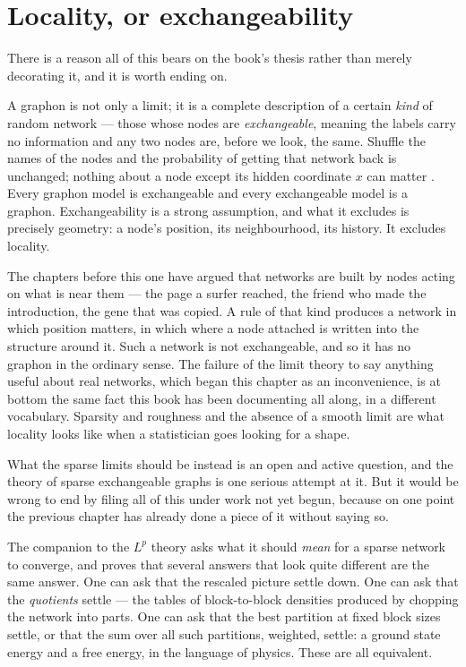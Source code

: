 \section{Locality, or exchangeability}

There is a reason all of this bears on the book's thesis rather than merely
decorating it, and it is worth ending on.

A graphon is not only a limit; it is a complete description of a certain
\emph{kind} of random network --- those whose nodes are \emph{exchangeable},
meaning the labels carry no information and any two nodes are, before we look,
the same. Shuffle the names of the nodes and the probability of getting that
network back is unchanged; nothing about a node except its hidden coordinate
$x$ can matter \citep{aldous1981,diaconis2008}. Every graphon model is exchangeable and every
exchangeable model is a graphon. Exchangeability is a strong assumption, and what
it excludes is precisely geometry: a node's position, its neighbourhood, its
history. It excludes locality.

The chapters before this one have argued that networks are built by nodes acting
on what is near them --- the page a surfer reached, the friend who made the
introduction, the gene that was copied. A rule of that kind produces a network in
which position matters, in which where a node attached is written into the
structure around it. Such a network is not exchangeable, and so it has no graphon
in the ordinary sense. The failure of the limit theory to say anything useful
about real networks, which began this chapter as an inconvenience, is at bottom
the same fact this book has been documenting all along, in a different vocabulary.
Sparsity and roughness and the absence of a smooth limit are what locality looks
like when a statistician goes looking for a shape.

What the sparse limits should be instead is an open and active question, and the
theory of sparse exchangeable graphs \citep{caron2017} is one serious attempt at
it. But it would be wrong to end by filing all of this under work not yet begun,
because on one point the previous chapter has already done a piece of it without
saying so.

The companion to the $L^p$ theory \citep{borgs2018} asks what it should
\emph{mean} for a sparse network to converge, and proves that several answers that
look quite different are the same answer. One can ask that the rescaled picture
settle down. One can ask that the \emph{quotients} settle --- the tables of
block-to-block densities produced by chopping the network into parts. One can ask
that the best partition at fixed block sizes settle, or that the sum over all such
partitions, weighted, settle: a ground state energy and a free energy, in the
language of physics. These are all equivalent.

